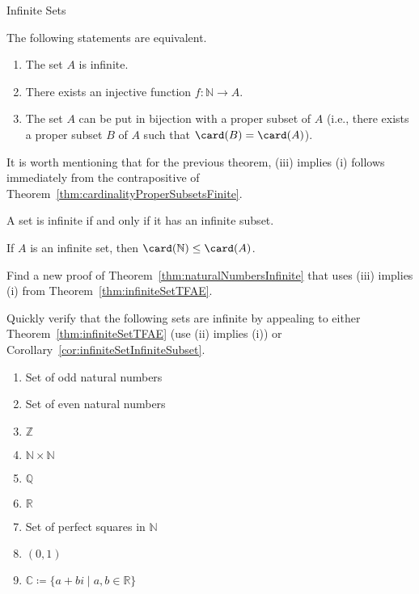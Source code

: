 \begin{section}{Infinite Sets}
\begin{theorem}\label{thm:infiniteSetTFAE}
The following statements are equivalent.
\begin{enumerate}[label=\textrm{(\roman*)}]
\item The set $A$ is infinite.
\item There exists an injective function $f:\mathbb{N}\to A$.
\item The set $A$ can be put in bijection with a proper subset of $A$ (i.e., there exists a proper subset $B$ of $A$ such that $\card(B)=\card(A)$).
\end{enumerate}
\end{theorem}

It is worth mentioning that for the previous theorem, (iii) implies (i) follows immediately from the contrapositive of Theorem~\ref{thm:cardinalityProperSubsetsFinite}.

\begin{corollary}\label{cor:infiniteSetInfiniteSubset}
A set is infinite if and only if it has an infinite subset.
\end{corollary}

\begin{corollary}
If $A$ is an infinite set, then $\card(\mathbb{N})\leq \card(A)$.
\end{corollary}

\begin{problem}
Find a new proof of Theorem~\ref{thm:naturalNumbersInfinite} that uses (iii) implies (i) from Theorem~\ref{thm:infiniteSetTFAE}.
\end{problem}

\begin{problem}\label{prob:moreInfiniteSets}
Quickly verify that the following sets are infinite by appealing to either Theorem~\ref{thm:infiniteSetTFAE} (use (ii) implies (i)) or Corollary~\ref{cor:infiniteSetInfiniteSubset}.
\begin{enumerate}[label=\textrm{(\alph*)}]
\item Set of odd natural numbers
\item Set of even natural numbers
\item $\mathbb{Z}$
\item $\mathbb{N}\times \mathbb{N}$
\item $\mathbb{Q}$
\item $\mathbb{R}$
\item Set of perfect squares in $\mathbb{N}$
\item $(0,1)$
\item $\mathbb{C}\coloneqq \{a+bi\mid a,b\in\mathbb{R}\}$
\end{enumerate}
\end{problem}

\end{section}